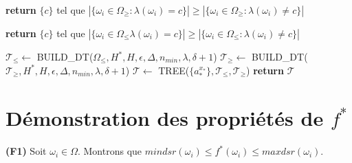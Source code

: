\documentclass[a4paper]{article}
\begin{document}
\begin{algorithm}[H]
\begin{algorithmic}
    \State \textbf{return} $\{c\}$ tel que $|\{\omega_i \in \Omega_{\geq}:
    \lambda(\omega_i) = c\}| \geq |\{\omega_i \in \Omega_{\geq}:
    \lambda(\omega_i) \neq c\}|$
\EndIf

    \State \textbf{return} $\{c\}$ tel que $|\{\omega_i \in \Omega_{\leq}
    \lambda(\omega_i) = c\}| \geq |\{\omega_i \in \Omega_{\leq}:
    \lambda(\omega_i) \neq c\}|$
\EndIf

\State $\mathcal{T}_{\leq}\gets$ BUILD\_DT($\Omega_{\leq}, H^*, H, \epsilon, \Delta,
    n_{min}, \lambda, \delta +1$) 
\State $\mathcal{T}_{\geq}\gets$
    BUILD\_DT($\mathcal{T}_{\geq}, H^*, H, \epsilon, \Delta, n_{min}, \lambda, \delta
    +1$)
\State $\mathcal{T} \gets$ TREE($\{a^{x_*}_*\}, \mathcal{T}_{\leq}, \mathcal{T}_{\geq}$)
\State \textbf{return} $\mathcal{T}$

\EndProcedure
\end{algorithmic}
\end{algorithm}

\section{Démonstration des propriétés de $f^*$}

\textbf{(F1)} Soit $\omega_i \in \Omega$. Montrons que $mindsr(\omega_i) \leq
f^*(\omega_i) \leq maxdsr(\omega_i)$.
\end{document}
